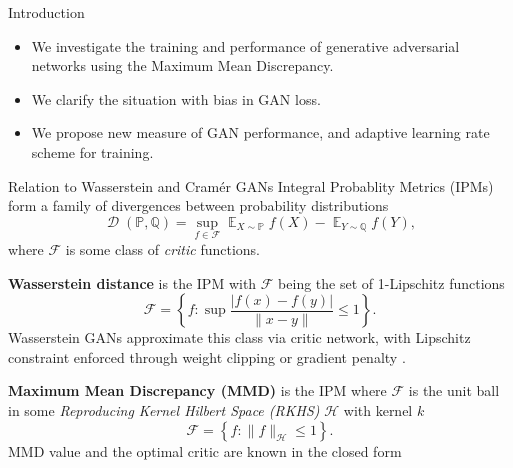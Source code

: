 \documentclass[xcolor={table}]{beamer}
\DeclareMathOperator{\D}{\mathcal{D}}
\DeclareMathOperator*{\E}{\mathbb{E}}
\newcommand{\F}{\mathcal{F}}
\newcommand{\h}{\mathcal{H}}
\newcommand{\PP}{\mathbb P}
\newcommand{\QQ}{\mathbb Q}
\begin{document}
\begin{frame}{}
\maketitle
\begin{columns}[T, totalwidth=\textwidth]

  \begin{column}{.32\textwidth}
    \begin{block}{Introduction}
      \begin{itemize}
        \item We investigate the training and performance of generative adversarial networks 
              using the Maximum Mean Discrepancy.%
        \item We clarify the situation with 
              bias in GAN loss. %
        \item We propose new measure of GAN performance, %
              and adaptive learning rate scheme for training.
      \end{itemize}
    \end{block}
    \vspace*{-1.2cm}
    \begin{block}{Relation to Wasserstein and Cram\'er GANs} 
      Integral Probablity Metrics (IPMs) form a family of divergences between 
      probability distributions
      \begin{equation}
        \D(\PP, \QQ) = \sup_{f\in\F} \E_{X\sim\PP}f(X) - \E_{Y\sim\QQ}f(Y),
      \end{equation}
      where $\F$ is some class of \emph{critic} functions. 
      \begin{itemize}
        \item{\textbf{Wasserstein distance} is the IPM with $\F$ being the set of 1-Lipschitz functions
          \[  
            \F = \left\{f: \sup\frac{|f(x) - f(y)|}{\|x - y\|}\leq 1\right\}. 
          \]
          Wasserstein GANs approximate this class via critic network, with Lipschitz 
          constraint enforced through weight clipping \citep{wgan} or gradient 
          penalty \citep{wgan-gp}.
        \item \textbf{Maximum Mean Discrepancy (MMD)} \citep{mmd-jmlr} is the IPM 
          where $\F$ is the unit ball in some 
          \emph{Reproducing Kernel Hilbert Space (RKHS)} $\h$ with kernel $k$
          \[ \F = \left\{f: \|f\|_{\h} \leq 1\right\}. \]
          MMD value and the optimal critic are known in the closed form
}
\end{itemize}
\end{block}
\end{column}
\end{columns}
\end{frame}
\end{document}
